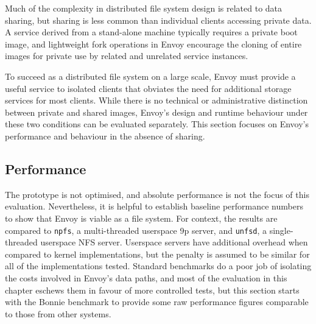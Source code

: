 Much of the complexity in distributed file system design is related to data sharing, but sharing is less common than individual clients accessing private data. A service derived from a stand-alone machine typically requires a private boot image, and lightweight fork operations in Envoy encourage the cloning of entire images for private use by related and unrelated service instances.

To succeed as a distributed file system on a large scale, Envoy must provide a useful service to isolated clients that obviates the need for additional storage services for most clients. While there is no technical or administrative distinction between private and shared images, Envoy's design and runtime behaviour under these two conditions can be evaluated separately. This section focuses on Envoy's performance and behaviour in the absence of sharing.

\subsection{Performance}

The prototype is not optimised, and absolute performance is not the focus of this evaluation. Nevertheless, it is helpful to establish baseline performance numbers to show that Envoy is viable as a file system. For context, the results are compared to \texttt{npfs}, a multi-threaded userspace 9p server, and \texttt{unfsd}, a single-threaded userspace NFS server. Userspace servers have additional overhead when compared to kernel implementations, but the penalty is assumed to be similar for all of the implementations tested. Standard benchmarks do a poor job of isolating the costs involved in Envoy's data paths, and most of the evaluation in this chapter eschews them in favour of more controlled tests, but this section starts with the Bonnie benchmark to provide some raw performance figures comparable to those from other systems.


